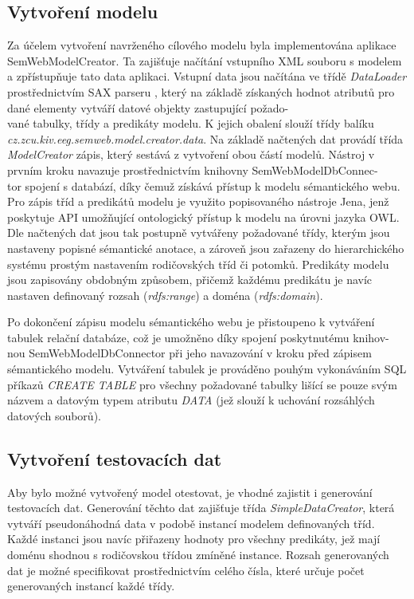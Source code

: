 \documentclass{projekt}
\begin{document}
\subsection{Vytvoření modelu}
\hspace{0.65cm}Za účelem vytvoření navrženého cílového modelu byla implementována aplikace SemWebModelCreator. Ta zajišťuje načítání vstupního XML souboru s modelem a zpřístupňuje tato data aplikaci. Vstupní data jsou načítána ve třídě {\it DataLoader} prostřednictvím SAX parseru \cite{_16}, který na základě získaných hodnot atributů pro dané elementy vytváří datové objekty zastupující požado-\\vané tabulky, třídy a predikáty modelu. K jejich obalení slouží třídy balíku {\it cz.zcu.kiv.eeg.semweb.model.creator.data}. Na základě načtených dat provádí třída {\it ModelCreator} zápis, který sestává z vytvoření obou částí modelů. Nástroj v prvním kroku navazuje prostřednictvím knihovny SemWebModelDbConnec-\\tor spojení s databází, díky čemuž získává přístup k modelu sémantického webu. Pro zápis tříd a predikátů modelu je využito popisovaného nástroje Jena, jenž poskytuje API umožňující ontologický přístup k modelu na úrovni jazyka OWL. Dle načtených dat jsou tak postupně vytvářeny požadované třídy, kterým jsou nastaveny popisné sémantické anotace, a zároveň jsou zařazeny do hierarchického systému prostým nastavením rodičovských tříd či potomků. Predikáty modelu jsou zapisovány obdobným způsobem, přičemž každému predikátu je navíc nastaven definovaný rozsah ({\it rdfs:range}) a doména ({\it rdfs:domain}).

Po dokončení zápisu modelu sémantického webu je přistoupeno k vytváření tabulek relační databáze, což je umožněno díky spojení poskytnutému knihov-\\nou SemWebModelDbConnector při jeho navazování v kroku před zápisem sémantického modelu. Vytváření tabulek je prováděno pouhým vykonáváním SQL příkazů {\it CREATE TABLE} pro všechny požadované tabulky lišící se pouze svým názvem a datovým typem atributu {\it DATA} (jež slouží k uchování rozsáhlých datových souborů). 

\subsection{Vytvoření testovacích dat}
\hspace{0.65cm}Aby bylo možné vytvořený model otestovat, je vhodné zajistit i generování testovacích dat. Generování těchto dat zajišťuje třída {\it SimpleDataCreator}, která vytváří pseudonáhodná data v podobě instancí modelem definovaných tříd. Každé instanci jsou navíc přiřazeny hodnoty pro všechny predikáty, jež mají doménu shodnou s rodičovskou třídou zmíněné instance. Rozsah generovaných dat je možné specifikovat prostřednictvím celého čísla, které určuje počet generovaných instancí každé třídy.
\end{document}
